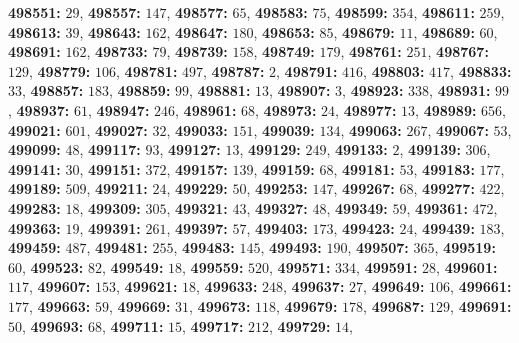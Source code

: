 \textsf{\bfseries 498551:} $29$, \textsf{\bfseries 498557:} $147$, \textsf{\bfseries 498577:} $65$, \textsf{\bfseries 498583:} $75$, \textsf{\bfseries 498599:} $354$, \textsf{\bfseries 498611:} $259$, \textsf{\bfseries 498613:} $39$, \textsf{\bfseries 498643:} $162$, \textsf{\bfseries 498647:} $180$, \textsf{\bfseries 498653:} $85$, \textsf{\bfseries 498679:} $11$, \textsf{\bfseries 498689:} $60$, \textsf{\bfseries 498691:} $162$, \textsf{\bfseries 498733:} $79$, \textsf{\bfseries 498739:} $158$, \textsf{\bfseries 498749:} $179$, \textsf{\bfseries 498761:} $251$, \textsf{\bfseries 498767:} $129$, \textsf{\bfseries 498779:} $106$, \textsf{\bfseries 498781:} $497$, \textsf{\bfseries 498787:} $2$, \textsf{\bfseries 498791:} $416$, \textsf{\bfseries 498803:} $417$, \textsf{\bfseries 498833:} $33$, \textsf{\bfseries 498857:} $183$, \textsf{\bfseries 498859:} $99$, \textsf{\bfseries 498881:} $13$, \textsf{\bfseries 498907:} $3$, \textsf{\bfseries 498923:} $338$, \textsf{\bfseries 498931:} $99$, \textsf{\bfseries 498937:} $61$, \textsf{\bfseries 498947:} $246$, \textsf{\bfseries 498961:} $68$, \textsf{\bfseries 498973:} $24$, \textsf{\bfseries 498977:} $13$, \textsf{\bfseries 498989:} $656$, \textsf{\bfseries 499021:} $601$, \textsf{\bfseries 499027:} $32$, \textsf{\bfseries 499033:} $151$, \textsf{\bfseries 499039:} $134$, \textsf{\bfseries 499063:} $267$, \textsf{\bfseries 499067:} $53$, \textsf{\bfseries 499099:} $48$, \textsf{\bfseries 499117:} $93$, \textsf{\bfseries 499127:} $13$, \textsf{\bfseries 499129:} $249$, \textsf{\bfseries 499133:} $2$, \textsf{\bfseries 499139:} $306$, \textsf{\bfseries 499141:} $30$, \textsf{\bfseries 499151:} $372$, \textsf{\bfseries 499157:} $139$, \textsf{\bfseries 499159:} $68$, \textsf{\bfseries 499181:} $53$, \textsf{\bfseries 499183:} $177$, \textsf{\bfseries 499189:} $509$, \textsf{\bfseries 499211:} $24$, \textsf{\bfseries 499229:} $50$, \textsf{\bfseries 499253:} $147$, \textsf{\bfseries 499267:} $68$, \textsf{\bfseries 499277:} $422$, \textsf{\bfseries 499283:} $18$, \textsf{\bfseries 499309:} $305$, \textsf{\bfseries 499321:} $43$, \textsf{\bfseries 499327:} $48$, \textsf{\bfseries 499349:} $59$, \textsf{\bfseries 499361:} $472$, \textsf{\bfseries 499363:} $19$, \textsf{\bfseries 499391:} $261$, \textsf{\bfseries 499397:} $57$, \textsf{\bfseries 499403:} $173$, \textsf{\bfseries 499423:} $24$, \textsf{\bfseries 499439:} $183$, \textsf{\bfseries 499459:} $487$, \textsf{\bfseries 499481:} $255$, \textsf{\bfseries 499483:} $145$, \textsf{\bfseries 499493:} $190$, \textsf{\bfseries 499507:} $365$, \textsf{\bfseries 499519:} $60$, \textsf{\bfseries 499523:} $82$, \textsf{\bfseries 499549:} $18$, \textsf{\bfseries 499559:} $520$, \textsf{\bfseries 499571:} $334$, \textsf{\bfseries 499591:} $28$, \textsf{\bfseries 499601:} $117$, \textsf{\bfseries 499607:} $153$, \textsf{\bfseries 499621:} $18$, \textsf{\bfseries 499633:} $248$, \textsf{\bfseries 499637:} $27$, \textsf{\bfseries 499649:} $106$, \textsf{\bfseries 499661:} $177$, \textsf{\bfseries 499663:} $59$, \textsf{\bfseries 499669:} $31$, \textsf{\bfseries 499673:} $118$, \textsf{\bfseries 499679:} $178$, \textsf{\bfseries 499687:} $129$, \textsf{\bfseries 499691:} $50$, \textsf{\bfseries 499693:} $68$, \textsf{\bfseries 499711:} $15$, \textsf{\bfseries 499717:} $212$, \textsf{\bfseries 499729:} $14$, 
